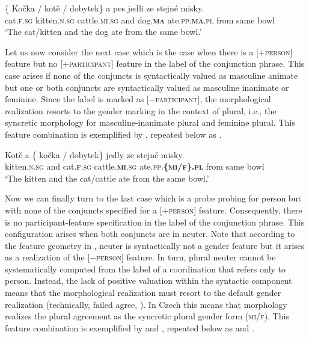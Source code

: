 \documentclass[output=paper,
modfonts
newtxmath,
hidelinks
]{langscibook}
\begin{document}
\ea\gll \{\hspace{-2pt} Kočka / kotě / dobytek\} a pes jedli ze stejné misky.\label{baseline-anim-rep}\\
{} cat.\textsc{f.sg} {} kitten.\textsc{n.sg} {} cattle.\textsc{mi.sg} and dog.\textsc{\textbf{ma}} ate.\textsc{pp.\textbf{ma}.pl} from same bowl\\
\glt `The cat/kitten and the dog ate from the same bowl.'\\\hfill {}
\z

\noindent Let us now consider the next case which is the case when there is a [$+$\textsc{person}] feature but no [$+$\textsc{participant}] feature in the label of the conjunction phrase. This case arises if none of the conjuncts is syntactically valued as masculine animate but one or both conjuncts are syntactically valued as masculine inanimate or feminine. Since the label is marked as [$-$\textsc{participant}], the morphological realization resorts to the gender marking in the context of plural, i.e., the syncretic morphology for masculine-inanimate plural and feminine plural. This feature combination is exemplified by , repeated below as .

\ea\gll Kotě a \{\hspace{-2pt} kočka / dobytek\} jedly ze stejné misky.\label{baseline-inanim-rep}\\
kitten.\textsc{n.sg} and {} cat.\textsc{\textbf{f}.sg} {} cattle.\textsc{\textbf{mi}.sg} ate.\textsc{pp.\textbf{\{mi/f\}.pl}} from same bowl\\
\glt `The kitten and the cat/cattle ate from the same bowl.'\\\hfill{}
\z

\noindent Now we can finally turn to the last case which is a probe probing for person but with none of the conjuncts specified for a [$+$\textsc{person}] feature. Consequently, there is no participant-feature specification in the label of the conjunction phrase. This configuration arises when both conjuncts are in neuter. Note that according to the feature geometry in , neuter is syntactically not a gender feature but it arises as a realization of the [$-$\textsc{person}] feature.  In turn, plural neuter cannot be systematically computed from the label of a coordination that refers only to person. Instead, the lack of positive valuation  within the syntactic component means that the morphological realization must resort to the default gender realization (technically, failed agree, \citealt{Preminger2009}). In Czech this means that  morphology realizes the plural agreement as the syncretic plural gender form (\textsc{mi/f}). This feature combination is exemplified by  and , repeated below as  and .
\end{document}
